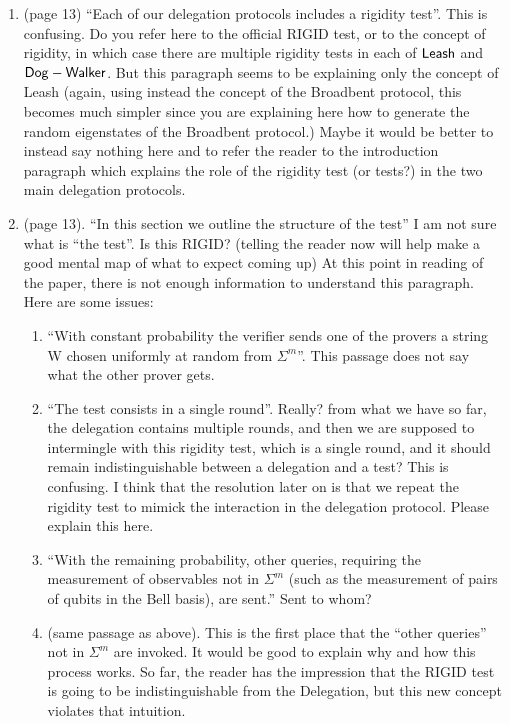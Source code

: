 \documentclass[12pt]{article}
\newcommand{\DW}{{\sf Dog-Walker }}
\newcommand{\Leash}{{\sf Leash }}
\newcommand{\Broad}{{\sf Broadbent }}
\begin{document}
\begin{enumerate}
\item (page 13) ``Each of our delegation protocols includes a rigidity test''. This is confusing. Do you refer here to the official RIGID test, or to the concept of rigidity, in which case there are multiple rigidity tests in each of $\Leash$ and $\DW$. But this paragraph seems to be explaining only the concept of \Leash (again, using instead the concept of the \Broad protocol, this becomes much simpler since you are explaining here how to generate the random eigenstates of the \Broad protocol.) Maybe it would be better to instead say nothing here and to refer the reader to the introduction paragraph which explains the role of the rigidity test (or tests?) in the two main delegation protocols.
\item (page 13). ``In this section we outline the structure of the test'' I am not sure what is ``the test''. Is this RIGID? (telling the reader now will help make a good mental map of what to expect coming up) At this point in reading of the paper, there is not enough information to understand this paragraph. Here are some issues:
    \begin{enumerate}
    \item ``With constant probability
the verifier sends one of the provers a string W chosen uniformly at random from $\Sigma^m$''. This passage does not say what the other prover gets.
\item ``The test consists in a single round''. Really? from what we have so far, the delegation contains multiple rounds, and then we are supposed to intermingle with this rigidity test, which is a single round, and it should remain indistinguishable between a delegation and a test? This is confusing. I think that the resolution later on is that we repeat the rigidity test to mimick the interaction in the delegation protocol. Please explain this here.
\item ``With the remaining
probability, other queries, requiring the measurement of observables not in $\Sigma^m$ (such as the measurement of
pairs of qubits in the Bell basis), are sent.'' Sent to whom?
\item (same passage as above). This is the first place that the ``other queries'' not in $\Sigma^m$ are invoked. It would be good to explain why and how this process works. So far, the reader has the impression that the RIGID test is going to be indistinguishable from the Delegation, but this new concept violates that intuition.
    \end{enumerate}

\end{enumerate}
\end{document}
